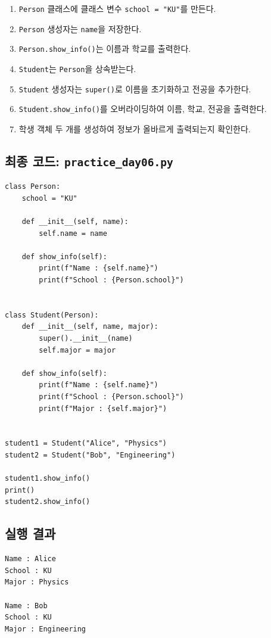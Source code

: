 \documentclass[11pt,a4paper]{article}
\begin{document}
\begin{enumerate}[leftmargin=1.8em]
    \item \texttt{Person} 클래스에 클래스 변수 \texttt{school = "KU"}를 만든다.
    \item \texttt{Person} 생성자는 \texttt{name}을 저장한다.
    \item \texttt{Person.show\_info()}는 이름과 학교를 출력한다.
    \item \texttt{Student}는 \texttt{Person}을 상속받는다.
    \item \texttt{Student} 생성자는 \texttt{super()}로 이름을 초기화하고 전공을 추가한다.
    \item \texttt{Student.show\_info()}를 오버라이딩하여 이름, 학교, 전공을 출력한다.
    \item 학생 객체 두 개를 생성하여 정보가 올바르게 출력되는지 확인한다.
\end{enumerate}

\subsection{최종 코드: \texttt{practice\_day06.py}}

\begin{lstlisting}
class Person:
    school = "KU"

    def __init__(self, name):
        self.name = name

    def show_info(self):
        print(f"Name : {self.name}")
        print(f"School : {Person.school}")


class Student(Person):
    def __init__(self, name, major):
        super().__init__(name)
        self.major = major

    def show_info(self):
        print(f"Name : {self.name}")
        print(f"School : {Person.school}")
        print(f"Major : {self.major}")


student1 = Student("Alice", "Physics")
student2 = Student("Bob", "Engineering")

student1.show_info()
print()
student2.show_info()
\end{lstlisting}

\subsection{실행 결과}

\begin{verbatim}
Name : Alice
School : KU
Major : Physics

Name : Bob
School : KU
Major : Engineering
\end{verbatim}
\end{document}
